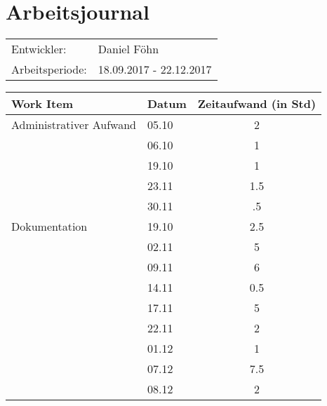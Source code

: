 \documentclass[a4paper, 10pt, fleqn]{article}
\newcommand{\header}{\textbf{Work Item}&\textbf{Datum}&\textbf{Zeitaufwand (in Std)}\\\toprule}
\begin{document}
	\section*{Arbeitsjournal}
    \begin{tabular}{ll}
        Entwickler: & Daniel Föhn \\
        Arbeitsperiode: & 18.09.2017 - 22.12.2017\\
    \end{tabular}
	\begin{longtable}{p{9cm}|p{2cm}|c}
        \header

        Administrativer Aufwand & 05.10 & 2\\
        & 06.10 & 1\\
        & 19.10 & 1\\
        & 23.11 & 1.5\\
        & 30.11 & .5\\
        
        Dokumentation & 19.10 & 2.5\\
        & 02.11 & 5\\
        & 09.11 & 6\\
        & 14.11 & 0.5\\
        & 17.11 & 5\\
        & 22.11 & 2\\
        & 01.12 & 1\\
        & 07.12 & 7.5\\
        & 08.12 & 2\\
        

\end{longtable}
\end{document}
